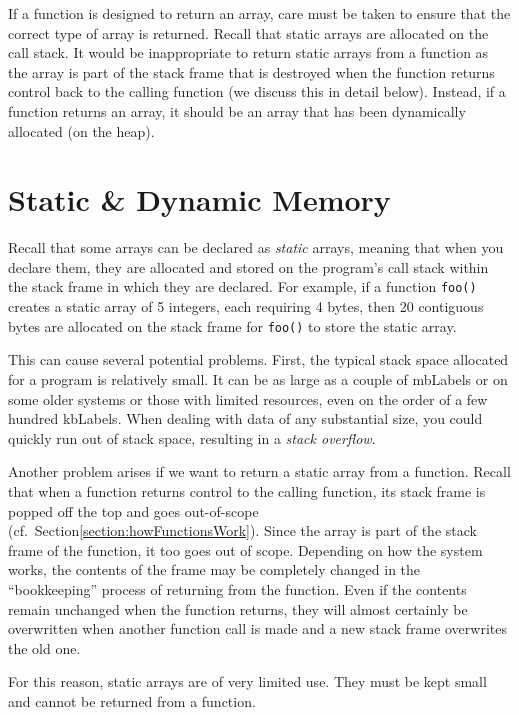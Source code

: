 If a function is designed to return an array, care must be taken to
ensure that the correct type of array is returned.  Recall that static
arrays are allocated on the call stack.  It would be inappropriate
to return static arrays from a function as the array is part of the
stack frame that is destroyed when the function returns control
back to the calling function (we discuss this in detail below).  
Instead, if a function returns an array, it should be an array that
has been dynamically allocated (on the heap).  

\section{Static \& Dynamic Memory}
\label{section:arraysInDepth}

Recall that some arrays can be declared as \emph{static} arrays,
meaning that when you declare them, they are allocated and
stored on the program's call stack within the stack frame in which
they are declared.  For example, if a function \texttt{foo()}
creates a static array of 5 integers, each requiring 4 bytes, then
20 contiguous bytes are allocated on the stack frame for 
\texttt{foo()} to store the static array.

This can cause several potential problems.  First, the typical 
stack space allocated for a program is relatively small.  It can be as
large as a couple of \glspl{mbLabel} or on some older systems or
those with limited resources, even on the order of a few hundred
\glspl{kbLabel}.  When dealing with data of any substantial
size, you could quickly run out of stack space, resulting in
a \emph{stack overflow}. 

Another problem arises if we want to return a static array from
a function.  Recall that when a function returns control to the 
calling function, its stack frame is popped off the top and 
goes out-of-scope (cf.\ Section\ref{section:howFunctionsWork}).
Since the array is part of the stack frame of the function, it
too goes out of scope.  Depending on how the system works, 
the contents of the frame may be completely changed in the
``bookkeeping'' process of returning from the function.  Even
if the contents remain unchanged when the function returns,
they will almost certainly be overwritten when another function
call is made and a new stack frame overwrites the old one.

For this reason, static arrays are of very limited use.  They
must be kept small and cannot be returned from a function.


